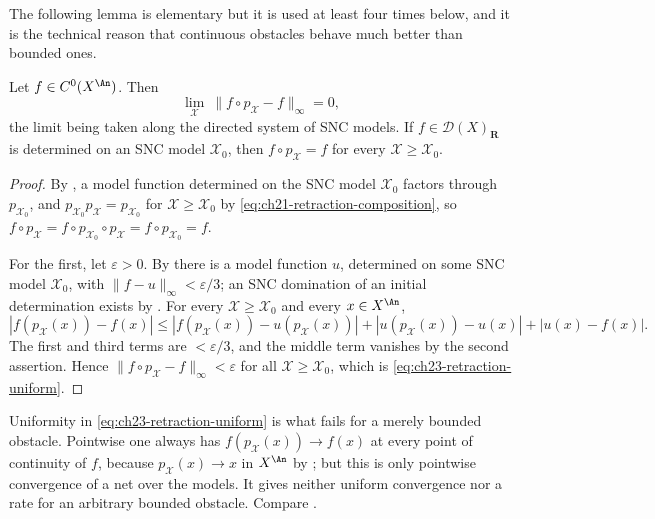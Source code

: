 The following lemma is elementary but it is used at least four times below,
and it is the technical reason that continuous obstacles behave much better
than bounded ones.

\begin{lemma}
\label{lem:ch23-retraction-uniform}
Let $f\in C^0(X^{\An})$.  Then
\begin{equation}\label{eq:ch23-retraction-uniform}
 \lim_{\mathcal X}\ \|f\circ p_{\mathcal X}-f\|_\infty=0,
\end{equation}
the limit being taken along the directed system of SNC models.  If
$f\in\mathcal D(X)_{\mathbf R}$ is determined on an SNC model
$\mathcal X_0$, then
$f\circ p_{\mathcal X}=f$ for every $\mathcal X\geq\mathcal X_0$.
\end{lemma}

\begin{proof}
By , a model function determined on the
SNC model $\mathcal X_0$ factors through
$p_{\mathcal X_0}$, and $p_{\mathcal X_0}p_{\mathcal X}=p_{\mathcal X_0}$
for $\mathcal X\geq\mathcal X_0$ by
\eqref{eq:ch21-retraction-composition}, so
$f\circ p_{\mathcal X}=f\circ p_{\mathcal X_0}\circ p_{\mathcal
X}=f\circ p_{\mathcal X_0}=f$.

For the first, let $\varepsilon>0$.  By
 there is a model function $u$,
determined on some SNC model $\mathcal X_0$, with
$\|f-u\|_\infty<\varepsilon/3$; an SNC domination of an initial
determination exists by .
For every $\mathcal X\geq\mathcal X_0$ and every $x\in X^{\An}$,
\[
 |f(p_{\mathcal X}(x))-f(x)|
 \leq|f(p_{\mathcal X}(x))-u(p_{\mathcal X}(x))|
   +|u(p_{\mathcal X}(x))-u(x)|
   +|u(x)-f(x)| .
\]
The first and third terms are $<\varepsilon/3$, and the middle term
vanishes by the second assertion.  Hence
$\|f\circ p_{\mathcal X}-f\|_\infty<\varepsilon$ for all
$\mathcal X\geq\mathcal X_0$, which is
\eqref{eq:ch23-retraction-uniform}.
\end{proof}

\begin{remark}
\label{rem:ch23-retraction-uniform-scope}
Uniformity in \eqref{eq:ch23-retraction-uniform} is what fails for a merely
bounded obstacle.  Pointwise one always has
$f(p_{\mathcal X}(x))\to f(x)$ at every point of continuity of $f$,
because $p_{\mathcal X}(x)\to x$ in $X^{\An}$ by
; but this is only pointwise convergence of
a net over the models.  It gives neither uniform convergence nor a rate for
an arbitrary bounded obstacle.  Compare
.
\end{remark}

